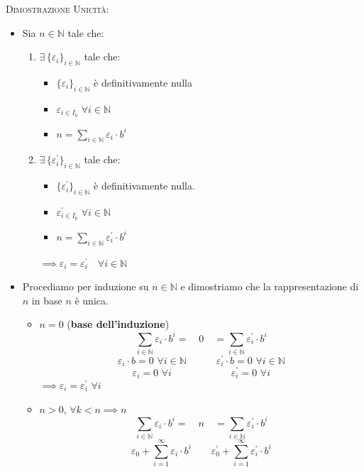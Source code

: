 \documentclass[10pt]{article}
\begin{document}
\textsc{Dimostrazione Unicità:}
\begin{itemize}
\item
Sia $n \in \mathbb{N}$ tale che:
\begin{enumerate}
\item
$\exists \, \{\varepsilon_i\}_{i \in \mathbb{N}}$ tale che:
\begin{itemize}
\item
$\{\varepsilon_i\}_{i \in \mathbb{N}}$ è definitivamente nulla
\item
$\varepsilon_{i \in I_b} \,\, \forall i \in \mathbb{N}$
\item
$n = \displaystyle{\sum_{i \in \mathbb{N}} \varepsilon_i \cdot b^i}$
\end{itemize}
\item
$\exists \, \{ \varepsilon^{'}_{i} \}_{i \in \mathbb{N}}$ tale che:
\begin{itemize}
\item
$\{\varepsilon^{'}_i \}_{i \in \mathbb{N}}$ è definitivamente nulla.
\item
$\varepsilon^{'}_{i \in I_b} \,\, \forall i \in \mathbb{N}$
\item
$n = \displaystyle{\sum_{i \in \mathbb{N}} \varepsilon^{'}_i \cdot b^i}$
\end{itemize}
$\implies \varepsilon_i = \varepsilon^{'}_i \quad \forall i \in \mathbb{N}$
\end{enumerate}
\item
Procediamo per induzione su $n \in \mathbb{N}$ e dimostriamo che la rappresentazione di $n$ in base $n$ è unica.
\begin{itemize}
\item
$n=0$ (\textbf{base dell'induzione})
$$ \sum_{i \in \mathbb{N}} \varepsilon_i \cdot b^i = \quad 0 \quad = \sum_{i \in \mathbb{N}} \varepsilon^{'}_i \cdot b^i $$
$$ \varepsilon_i \cdot b = 0 \,\, \forall i \in \mathbb{N} \quad \quad \quad \varepsilon^{'}_i \cdot b = 0 \,\, \forall i \in \mathbb{N} $$
$$\!\!\!\!\varepsilon_i = 0 \,\,\forall i \quad \quad \quad \quad \quad \quad \varepsilon^{'}_i = 0 \,\, \forall i$$ 
$\implies \varepsilon_i = \varepsilon^{'}_i \,\, \forall i$
\item
$n>0$, $\forall k < n \implies n$
$$ \sum_{i \in \mathbb{N}} \varepsilon_i \cdot b^i = \quad n \quad = \sum_{i \in \mathbb{N}} \varepsilon^{'}_i \cdot b^i $$
$$ \varepsilon_0 + \displaystyle{\sum_{i=1}^{\infty} \varepsilon_i \cdot b^i \quad \quad \varepsilon^{'}_0 + \sum_{i=1}^{\infty} \varepsilon^{'}_i \cdot b^i}$$

\end{itemize}
\end{itemize}
\end{document}

